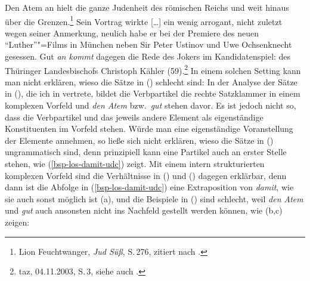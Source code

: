 \ex\label{bsp-den-atem-an-haelt-udc}
Den Atem an hielt die ganze Judenheit des römischen Reichs und weit hinaus über die Grenzen.\footnote{
        Lion Feuchtwanger, \emph{Jud Süß}, S.\,276, zitiert nach .
}
\ex Sein Vortrag wirkte [\ldots] %
ein wenig arrogant, nicht zuletzt wegen seiner Anmerkung,
neulich habe er bei der Premiere des neuen "`Luther"'"=Films in München neben
Sir Peter Ustinov und Uwe Ochsenknecht gesessen. %
Gut \emph{an kommt} dagegen die Rede des Jokers im Kandidatenspiel: des Thüringer Landesbischofs Christoph Kähler (59).\footnote{
        taz, 04.11.2003, S.\,3, siehe auch .%
}
\zl
In einem solchen Setting kann man nicht erklären, wieso die Sätze in () schlecht sind:
\eal
{}
\zl
In der Analyse der Sätze in (), die ich in  vertrete, bildet
die Verbpartikel die rechte Satzklammer in einem komplexen Vorfeld
und \emph{den Atem} bzw.\ \emph{gut} stehen davor. Es ist jedoch nicht so, dass die Verbpartikel
und das jeweils andere Element als eigenständige Konstituenten im Vorfeld stehen. Würde man eine
eigenständige Voranstellung der Elemente annehmen, so ließe sich nicht erklären, wieso die Sätze
in () ungrammatisch sind, denn prinzipiell kann eine Partikel auch an erster Stelle stehen,
wie (\ref{bsp-los-damit-udc}) zeigt. Mit einem intern strukturierten komplexen Vorfeld sind die Verhältnisse
in () und () dagegen erklärbar, denn dann ist die Abfolge in (\ref{bsp-los-damit-udc}) eine
Extraposition von \emph{damit}, wie sie auch sonst möglich ist (a), und die
Beispiele in () sind schlecht, weil \emph{den Atem} und \emph{gut} auch ansonsten nicht ins
Nachfeld gestellt werden können, wie (b,c) zeigen:
\eal
{}
\zl

